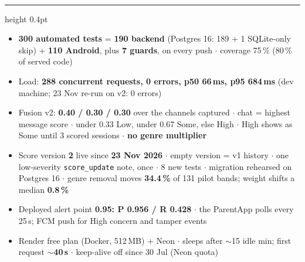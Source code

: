 \documentclass[10pt,a4paper]{article}
\newcommand{\sect}[1]{\vspace{2mm}{\color{teal}\bfseries\small\MakeUppercase{#1}}\\[0.6mm]\hrule height 0.4pt\vspace{1.2mm}}
\begin{document}
\sect{Numbers cold}
\begin{itemize}[leftmargin=4mm,itemsep=0.3mm,topsep=0mm]\small
\item \textbf{300 automated tests} = \textbf{190 backend} (Postgres 16: 189 + 1 SQLite-only skip) + \textbf{110 Android}, plus \textbf{7 guards}, on every push $\cdot$ coverage 75\,\% (80\,\% of served code)
\item Load: \textbf{288 concurrent requests, 0 errors, p50 66\,ms, p95 684\,ms} (dev machine; 23 Nov re-run on v2: 0 errors)
\item Fusion v2: \textbf{0.40 / 0.30 / 0.30} over the channels captured $\cdot$ chat = highest message score $\cdot$ under 0.33 Low, under 0.67 Some, else High $\cdot$ High shows as Some until 3 scored sessions $\cdot$ \textbf{no genre multiplier}
\item Score version \textbf{2} live since \textbf{23 Nov 2026} $\cdot$ empty version = v1 history $\cdot$ one low-severity \texttt{score\_update} note, once $\cdot$ 8 new tests $\cdot$ migration rehearsed on Postgres 16 $\cdot$ genre removal moves \textbf{34.4\,\%} of 131 pilot bands; weight shifts a median \textbf{0.8\,\%}
\item Deployed alert point \textbf{0.95: P 0.956 / R 0.428} $\cdot$ the ParentApp polls every 25\,s; FCM push for High concern and tamper events
\item Render free plan (Docker, 512\,MB) + Neon $\cdot$ sleeps after $\sim$15 idle min; first request \textbf{$\sim$40\,s} $\cdot$ keep-alive off since 30 Jul (Neon quota)
\end{itemize}
\end{document}
